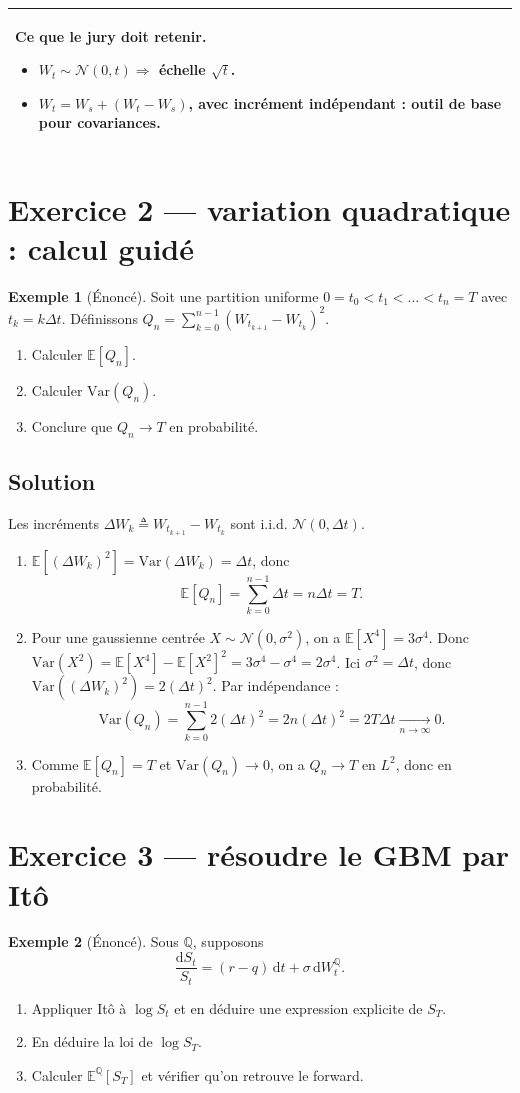 \documentclass[11pt,a4paper]{report}
\newcommand{\dd}{\mathrm{d}}
\newcommand{\E}{\mathbb{E}}
\newcommand{\Var}{\mathrm{Var}}
\newcommand{\Q}{\mathbb{Q}}
\newcommand{\1}{\mathbbm{1}}
\newcommand{\Normal}{\mathcal{N}}
\theoremstyle{definition}
\newtheorem{example}{Exemple}[chapter]
\theoremstyle{plain}
\theoremstyle{remark}
\newenvironment{jurybox}{%
  \begin{center}
  \setlength{\tabcolsep}{6pt}%
  \renewcommand{\arraystretch}{1.1}%
  \begin{tabular}{|p{0.94\textwidth}|}
  \hline
  \small\textbf{Ce que le jury doit retenir.}\par\medskip
}{%
  \\ \hline
  \end{tabular}
  \end{center}
}
\begin{document}
\begin{jurybox}
\begin{itemize}
  \item $W_t\sim\Normal(0,t)\Rightarrow$ échelle $\sqrt{t}$.
  \item $W_t=W_s+(W_t-W_s)$, avec incrément indépendant : outil de base pour covariances.
\end{itemize}
\end{jurybox}

\section{Exercice 2 --- variation quadratique : calcul guidé}
\begin{example}[Énoncé]
Soit une partition uniforme $0=t_0<t_1<\dots<t_n=T$ avec $t_k=k\Delta t$.
Définissons $Q_n=\sum_{k=0}^{n-1} (W_{t_{k+1}}-W_{t_k})^2$.
\begin{enumerate}[label=\alph*)]
  \item Calculer $\E[Q_n]$.
  \item Calculer $\Var(Q_n)$.
  \item Conclure que $Q_n\to T$ en probabilité.
\end{enumerate}
\end{example}

\subsection*{Solution}
Les incréments $\Delta W_k\triangleq W_{t_{k+1}}-W_{t_k}$ sont i.i.d. $\Normal(0,\Delta t)$.
\begin{enumerate}[label=\alph*)]
  \item $\E[(\Delta W_k)^2]=\Var(\Delta W_k)=\Delta t$, donc
  \[\E[Q_n]=\sum_{k=0}^{n-1} \Delta t = n\Delta t = T.\]
  \item Pour une gaussienne centrée $X\sim\Normal(0,\sigma^2)$, on a $\E[X^4]=3\sigma^4$.
  Donc $\Var(X^2)=\E[X^4]-\E[X^2]^2 = 3\sigma^4-\sigma^4=2\sigma^4$.
  Ici $\sigma^2=\Delta t$, donc $\Var((\Delta W_k)^2)=2(\Delta t)^2$.
  Par indépendance :
  \[\Var(Q_n)=\sum_{k=0}^{n-1}2(\Delta t)^2 = 2n(\Delta t)^2 = 2T\Delta t \xrightarrow[n\to\infty]{} 0.\]
  \item Comme $\E[Q_n]=T$ et $\Var(Q_n)\to 0$, on a $Q_n\to T$ en $L^2$, donc en probabilité.
\end{enumerate}

\section{Exercice 3 --- résoudre le GBM par Itô}
\begin{example}[Énoncé]
Sous $\Q$, supposons
\[\frac{\dd S_t}{S_t}=(r-q)\,\dd t + \sigma\,\dd W_t^{\Q}.
\]
\begin{enumerate}[label=\alph*)]
  \item Appliquer Itô à $\log S_t$ et en déduire une expression explicite de $S_T$.
  \item En déduire la loi de $\log S_T$.
  \item Calculer $\E^{\Q}[S_T]$ et vérifier qu'on retrouve le forward.
\end{enumerate}
\end{example}
\end{document}
